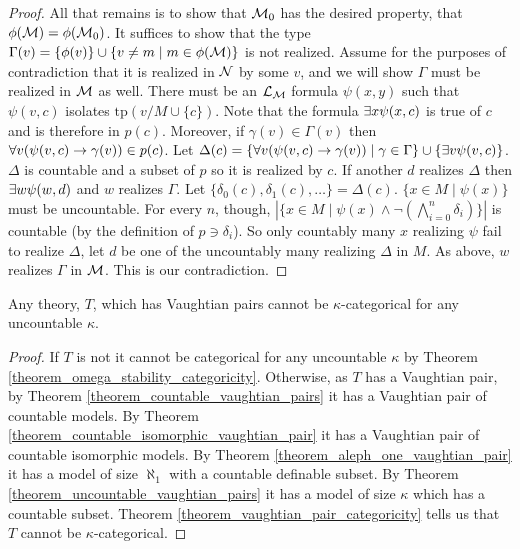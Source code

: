 \begin{proof}
All that remains is to show that \(\mathcal{M}_0\) has the desired property, that \(\phi(\mathcal{M}) = \phi(\mathcal{M}_0)\).   
It suffices to show that the type \(\Gamma(v) = \{\phi(v)\} \cup \{v \neq m \mid m \in \phi(\mathcal{M})\}\) is not realized. 
Assume for the purposes of contradiction that it is realized in \(\mathcal{N}\) by some \(v\), and we will show \(\Gamma\) must be realized in \(\mathcal{M}\) as well. 
There must be an \(\mathcal{L}_{\mathcal{M}}\) formula \(\psi(x, y)\) such that \(\psi(v, c)\) isolates \(\text{tp}(v/M \cup \{c\})\).%
Note that the formula \(\exists x \psi(x, c)\) is true of \(c\) and is therefore in \(p(c)\). 
Moreover, if \(\gamma(v) \in \Gamma(v)\) then \(\forall v (\psi(v, c) \to \gamma(v)) \in p(c)\). 
Let \(\Delta(c) = \{\forall v (\psi(v, c) \to \gamma(v)) \mid \gamma \in \Gamma\} \cup \{\exists v \psi(v, c)\}\).
\(\Delta\) is countable and a subset of \(p\) so it is realized by \(c\). 
If another \(d\) realizes \(\Delta\) then \(\exists w \psi(w, d)\) and \(w\) realizes \(\Gamma\).
Let \(\{\delta_0(c), \delta_1(c), \ldots\} = \Delta(c)\). 
\(\{x \in M \mid \psi(x)\}\) must be uncountable. 
For every \(n\), though, \(|\{x \in M \mid \psi(x) \land \neg (\bigwedge\limits_{i=0}^n\delta_i)\}|\) is countable (by the definition of \(p \ni \delta_i\)).
So only countably many \(x\) realizing \(\psi\) fail to realize \(\Delta\), let \(d\) be one of the uncountably many realizing \(\Delta\) in \(M\).
As above, \(w\) realizes \(\Gamma\) in \(\mathcal{M}\). This is our contradiction.  

\end{proof}

\begin{theorem}\label{theorem_vaughtian_pairs_categoricity}
Any theory, \(T\), which has Vaughtian pairs cannot be \(\kappa\)-categorical for any uncountable \(\kappa\).
\end{theorem}

\begin{proof}
If \(T\) is not \omst it cannot be categorical for any uncountable \(\kappa\) by Theorem \ref{theorem_omega_stability_categoricity}.
Otherwise, as \(T\) has a Vaughtian pair, by Theorem \ref{theorem_countable_vaughtian_pairs} it has a Vaughtian pair of countable models. 
By Theorem \ref{theorem_countable_isomorphic_vaughtian_pair} it has a Vaughtian pair of countable isomorphic models.
By Theorem \ref{theorem_aleph_one_vaughtian_pair} it has a model of size \(\aleph_1\) with a countable definable subset. 
By Theorem \ref{theorem_uncountable_vaughtian_pairs} it has a model of size \(\kappa\) which has a countable subset.  
Theorem \ref{theorem_vaughtian_pair_categoricity} tells us that \(T\) cannot be \(\kappa\)-categorical. 
\end{proof}
